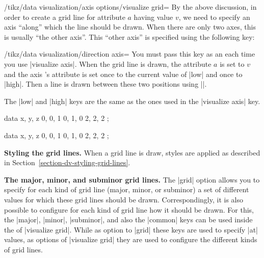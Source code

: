 \begin{key}{/tikz/data visualization/axis options/visualize grid=}
    By the above discussion, in order to create a grid line for attribute $a$
    having value $v$, we need to specify an axis ``along'' which the line
    should be drawn. When there  are only two axes, this is usually ``the other
    axis''. This ``other axis'' is specified using the following key:
    \begin{key}{/tikz/data visualization/direction axis=}
        You must pass this key as an  each time you use
        |visualize axis|. When the grid line is drawn, the attribute $a$ is set
        to $v$ and the axis 's attribute is set once to the
        current value of |low| and once to |high|. Then a line is drawn between
        these two positions using |\pgfpathdvlineto|.
    \end{key}
    The |low| and |high| keys are the same as the ones used in the
    |visualize axis| key.
\begin{codeexample}[preamble={\usetikzlibrary{datavisualization}}]
\tikz \datavisualization [
    xyz Cartesian cabinet,
    all axes={visualize axis={low=0, style=->}},
    x axis={visualize grid={direction axis=y axis}, grid=many},
    visualize as scatter]
  data {
    x, y, z
    0, 0, 1
    0, 1, 0
    2, 2, 2
  };
\end{codeexample}
\begin{codeexample}[preamble={\usetikzlibrary{datavisualization}}]
\tikz \datavisualization [
    xyz Cartesian cabinet,
    all axes={visualize axis={low=0, style=->}, grid=many},
    x axis={visualize grid={direction axis=z axis}},
    z axis={visualize grid={direction axis=x axis},
            visualize grid={direction axis=y axis},},
    visualize as scatter]
  data {
    x, y, z
    0, 0, 1
    0, 1, 0
    2, 2, 2
  };
\end{codeexample}


    \medskip
    \textbf{Styling the grid lines.}
    When a grid line is draw, styles are applied as described in
    Section~\ref{section-dv-styling-grid-lines}.


    \medskip
    \textbf{The major, minor, and subminor grid lines.}
    The |grid| option allows you to specify for each kind of grid line (major,
    minor, or subminor) a set of different values for which these grid lines
    should be drawn. Correspondingly, it is also possible to configure for each
    kind of grid line how it should be drawn. For this, the |major|, |minor|,
    |subminor|, and also the |common| keys can be used inside the
     of |visualize grid|. While as option to |grid| these keys
    are used to specify |at| values, as options of |visualize grid| they are
    used to configure the different kinds of grid lines.


\end{key}
